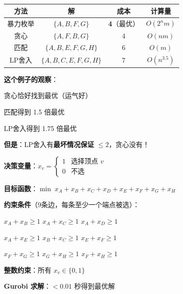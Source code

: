 \documentclass[12pt, a4paper]{ctexart}
\begin{document}
\begin{blackboard}

\begin{center}
\begin{tabular}{c|c|c|c}
方法 & 解 & 成本 & 计算量 \\
\hline
暴力枚举 & $\{A, B, F, G\}$ & \textbf{4}（最优） & $O(2^n m)$ \\
贪心 & $\{A, F, B, G\}$ & 4 & $O(nm)$ \\
匹配 & $\{A, B, E, F, G, H\}$ & 6 & $O(m)$ \\
LP舍入 & $\{A, B, C, E, F, G, H\}$ & 7 & $O(n^{3.5})$
\end{tabular}
\end{center}

\textbf{这个例子的观察}：

贪心恰好找到最优（运气好）

匹配得到 1.5 倍最优

LP舍入得到 1.75 倍最优

\textbf{但是}：LP舍入有\textbf{最坏情况保证} $\leq 2$，贪心没有！

\end{blackboard}

\begin{blackboard}

\textbf{决策变量}：$x_v = \begin{cases} 1 & \text{选择顶点 } v \\ 0 & \text{不选} \end{cases}$

\textbf{目标函数}：$\min \; x_A + x_B + x_C + x_D + x_E + x_F + x_G + x_H$

\textbf{约束条件}（9条边，每条至少一个端点被选）：

$x_A + x_B \geq 1$ \quad $x_A + x_C \geq 1$ \quad $x_A + x_D \geq 1$

$x_A + x_E \geq 1$ \quad $x_B + x_C \geq 1$ \quad $x_E + x_F \geq 1$

$x_F + x_G \geq 1$ \quad $x_G + x_H \geq 1$ \quad $x_F + x_H \geq 1$

\textbf{整数约束}：所有 $x_v \in \{0, 1\}$

\textbf{Gurobi 求解}：$< 0.01$ 秒得到最优解

\end{blackboard}
\end{document}
